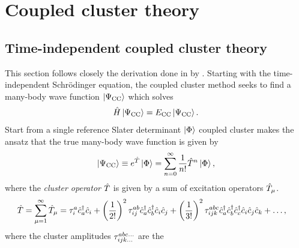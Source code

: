 \chapter{Coupled cluster theory}
    \label{chap:cc}


    \section{Time-independent coupled cluster theory}
        This section follows closely the derivation done in
         by
        \citeauthor{crawford2000introduction} \cite{crawford2000introduction}.
        Starting with the time-independent Schrödinger equation, the coupled
        cluster method seeks to find a many-body wave function $\ket{\Psi_{\text{CC}}}$ which
        solves
        \begin{align}
            \hat{H}\ket{\Psi_{\text{CC}}} = E_{\text{CC}}\ket{\Psi_{\text{CC}}}.
        \end{align}
        Start from a single reference Slater determinant $\ket{\Phi}$ coupled
        cluster makes the ansatz that the true many-body wave function is given
        by
        \begin{align}
            \ket{\Psi_{\text{CC}}} \equiv e^{\hat{T}}\ket{\Phi}
            = \sum_{n = 0}^{\infty}\frac{1}{n!}\hat{T}^n\ket{\Phi},
            \label{eq:cc_wave_function}
        \end{align}
        where the \emph{cluster operator} $\hat{T}$ is given by a sum of excitation
        operators $\hat{T}_{\mu}$.
        \begin{align}
            \hat{T} &= \sum_{\mu = 1}^{\infty} \hat{T}_{\mu}
            = \tau^a_i\hat{c}_{a}^{\dagger}\hat{c}_{i}
            + \left( \frac{1}{2!} \right)^2\tau^{ab}_{ij}\hat{c}_{a}^{\dagger}\hat{c}_{b}^{\dagger}\hat{c}_{i}\hat{c}_{j}
            + \left( \frac{1}{3!} \right)^2\tau^{abc}_{ijk}
            \hat{c}_{a}^{\dagger}\hat{c}_{b}^{\dagger}\hat{c}_{c}^{\dagger}\hat{c}_{i}\hat{c}_{j}\hat{c}_{k}
            + \dots,
            \label{eq:cluster-operator}
        \end{align}
        where the cluster amplitudes $\tau^{abc\dots}_{ijk\dots}$ are the
